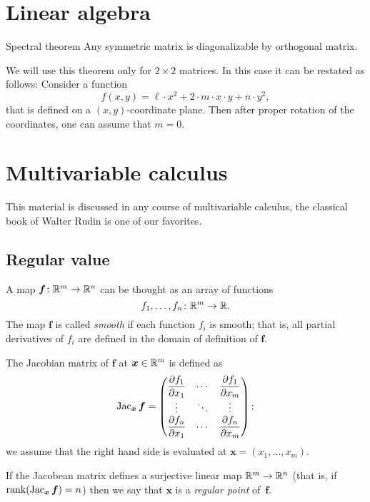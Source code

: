 \section{Linear algebra}

\begin{thm}{Spectral theorem}\label{thm:spectral}
Any symmetric matrix is diagonalizable  by orthogonal matrix.
\end{thm}

We will use this theorem only for $2{\times}2$ matrices.
In this case it can be restated as follows:
Consider a function 
\[f(x,y)=\ell\cdot x^2+2\cdot m\cdot x\cdot y+n\cdot y^2,\]
that is defined on a $(x,y)$-coordinate plane.
Then after proper rotation of the coordinates, one can assume that $m=0$. %


\section{Multivariable calculus}

This material is discussed in any course of multivariable calculus, the classical book of Walter Rudin \cite{rudin} is one of our favorites.

\subsection*{Regular value}

A map $\bm{f}\colon\mathbb{R}^m\to\mathbb{R}^n$ can be thought as an array of functions 
\[f_1,\dots,f_n\colon\mathbb{R}^m\to \mathbb{R}.\]
The map $\bm{f}$ is called \emph{smooth} if each function $f_i$ is smooth;
that is, all partial derivatives of $f_i$ are defined in the domain of definition of $\bm{f}$.

The Jacobian matrix of $\bm{f}$ at $\bm{x}\in\mathbb{R}^m$ is defined as
\[\mathop{\rm Jac}\nolimits_{\bm{x}}\bm{f}=
\begin{pmatrix}
\dfrac{\partial f_1}{\partial x_1} & \cdots & \dfrac{\partial f_1}{\partial x_m}\\
\vdots & \ddots & \vdots\\
\dfrac{\partial f_n}{\partial x_1} & \cdots & \dfrac{\partial f_n}{\partial x_m} \end{pmatrix};\]
we assume that the right hand side is evaluated at $\bm{x}=(x_1,\dots,x_m)$.

If the Jacobean matrix defines a surjective linear map $\mathbb{R}^m\to\mathbb{R}^n$ (that is, if $\mathop{\rm rank}\nolimits(\mathop{\rm Jac}\nolimits_{\bm{x}}\bm{f})=n$) then we say that 
$\bm{x}$ is a \emph{regular point} of~$\bm{f}$.

